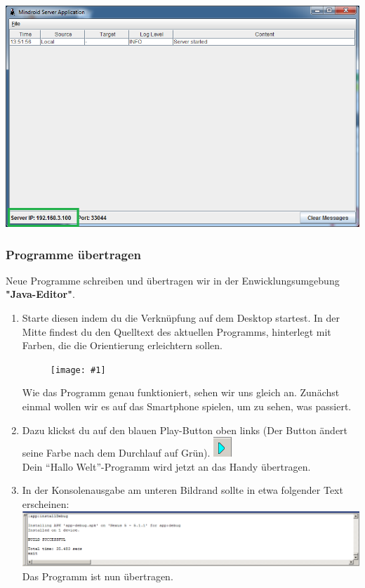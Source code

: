 \documentclass[
	12pt,
	article,
	type=bsc, %
	colorbacktitle,
	instlogo,
	accentcolor=tud1c,
	german,
	twoside
]{tudexercise}
\newcommand{\gcenterone}[1]{
	\begin{figure}[h]
	\centering 
	\texttt{[image: \#1]}
	\end{figure}
}
\begin{document}
\begin{enumerate}
\begin{minipage}{.5\textwidth}
\end{minipage}
	
\includegraphics[width=.5\textwidth]{img/MessageServer.png}


\end{enumerate}

\newpage


\subsubsection{Programme übertragen}
Neue Programme schreiben und übertragen wir in der	Enwicklungsumgebung \textbf{"Java-Editor"}.

\begin{enumerate}
\item Starte diesen indem du die Verknüpfung auf dem Desktop startest. In der Mitte findest du den Quelltext des aktuellen Programms, hinterlegt mit Farben, die die Orientierung erleichtern sollen.

\gcenterone{img/javaeditor.png}

Wie das Programm genau funktioniert, sehen wir uns gleich an. Zunächst einmal wollen wir es auf das Smartphone spielen, um zu sehen, was passiert.

\item Dazu klickst du auf den blauen Play-Button oben links (Der Button ändert seine Farbe nach dem Durchlauf auf Grün). 
\includegraphics{img/playbutton.png} \\ Dein “Hallo Welt”-Programm wird jetzt an das Handy übertragen.

\item In der Konsolenausgabe am unteren Bildrand sollte in etwa folgender Text erscheinen:
\includegraphics[width=\textwidth]{img/build.png}
Das Programm ist nun übertragen.
\end{enumerate}
\end{document}
